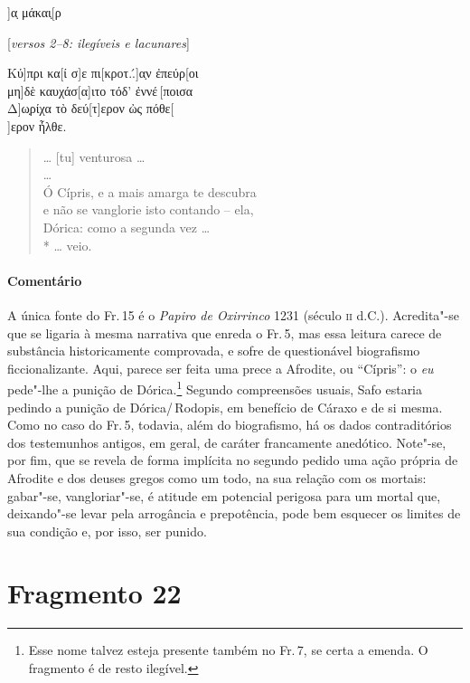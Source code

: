 \begin{gkverse}
]α̣ μάκαι̣[ρ

\textnormal{[\textit{versos 2--8: ilegíveis e lacunares}]}

Κύ]πρι κα[ί σ]ε πι[κροτ..́]α̣ν ἐπεύρ[οι\\
μη]δὲ καυχάσ[α]ιτο τόδ’ ἐννέ\,[ποισα\\
Δ]ω̣ρίχα τὸ δεύ[τ]ερον ὠς πόθε[\\
]ερον ἦλθε.

\end{gkverse}

\begin{verse}
\ldots{} [tu] venturosa \ldots{}\\ 
\ldots{}\\
Ó Cípris, e a mais amarga te descubra\\
e não se vanglorie isto contando -- ela,\\
Dórica: como a segunda vez \ldots{}\\*
\ldots{} veio.
\end{verse}

\medskip

{\paragraph{Comentário} A única fonte do Fr.\,15 é o \textit{Papiro de Oxirrinco} 1231 (século \textsc{ii} d.C.). \EP[1]
Acredita"-se que se ligaria à mesma narrativa que enreda o Fr.\,5, mas essa
leitura carece de substância historicamente comprovada, e sofre de
questionável biografismo ficcionalizante. Aqui,
parece ser feita uma prece a Afrodite, ou ``Cípris'': o \textit{eu} pede"-lhe a
punição de Dórica.\footnote{Esse nome talvez esteja presente também no Fr.\,7, se certa a emenda. O fragmento é de resto ilegível.} Segundo compreensões usuais, Safo estaria pedindo a punição
de Dórica/\,Rodopis, em benefício de Cáraxo e de si mesma. Como no caso do Fr.\,5,
todavia, além do biografismo, há os dados contraditórios dos testemunhos
antigos, em geral, de caráter francamente anedótico. Note"-se, por fim, que se
revela de forma implícita no segundo pedido uma ação própria de Afrodite e dos
deuses gregos como um todo, na sua relação com os mortais: gabar"-se,
vangloriar"-se, é atitude em potencial perigosa para um mortal que,
deixando"-se levar pela arrogância e prepotência, pode bem esquecer
os limites de sua condição e, por isso, ser punido.}

\pagebreak


\section{Fragmento 22}

